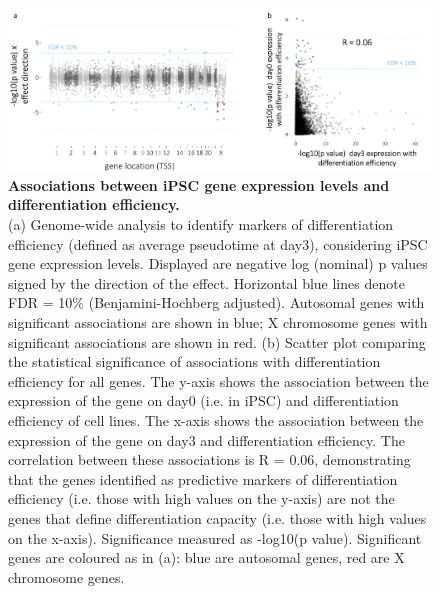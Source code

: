 \begin{figure}[h]
\centering
\includegraphics[width=15.5cm]{Chapter4/Fig/endodiff_diff_eff_manhattan.png}
\caption[Associations between iPSC gene expression levels and differentiation efficiency]{\textbf{Associations between iPSC gene expression levels and differentiation efficiency.}\\
(a) Genome-wide analysis to identify markers of differentiation efficiency (defined as average pseudotime at day3), considering iPSC gene expression levels. 
Displayed are negative log (nominal) p values signed by the direction of the effect. 
Horizontal blue lines denote FDR = 10\% (Benjamini-Hochberg adjusted). 
Autosomal genes with significant associations are shown in blue; X chromosome genes with significant associations are shown in red. 
(b) Scatter plot comparing the statistical significance of associations with differentiation efficiency for all genes. 
The y-axis shows the association between the expression of the gene on day0 (i.e. in iPSC) and differentiation efficiency of cell lines. 
The x-axis shows the association between the expression of the gene on day3 and differentiation efficiency. 
The correlation between these associations is R = 0.06, demonstrating that the genes identified as predictive markers of differentiation efficiency (i.e. those with high values on the y-axis) are not the genes that define differentiation capacity (i.e. those with high values on the x-axis). 
Significance measured as -log10(p value). 
Significant genes are coloured as in (a): blue are autosomal genes, red are X chromosome genes.}
\label{fig:endodiff_manhattan_differentiation}
\end{figure}

